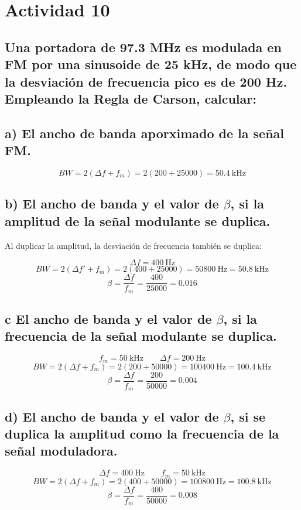 \section{ Actividad 10}

\subsection*{Una portadora de 97.3 MHz es modulada en FM por una sinusoide de 25 kHz,  de modo que la desviación de frecuencia pico es de 200 Hz. Empleando la Regla de Carson, calcular: }  

\subsection*{a) El ancho de banda aporximado de la señal FM.}

    \[
        BW = 2(\Delta f + f_m) = 2(200 + 25000) = 50.4~\text{kHz}
    \]
        
\subsection*{b) El ancho de banda y el valor de $\beta$, si la amplitud de la señal modulante se duplica.}
    
Al duplicar la amplitud, la desviación de frecuencia también se duplica:

    \[
        \Delta f = 400~\text{Hz}
    \]
    \[
        BW = 2(\Delta f' + f_m) = 2(400 + 25000) = 50800~\text{Hz} = 50.8~\text{kHz}
    \]
    \[
        \beta = \frac{\Delta f}{f_m} = \frac{400}{25000} = 0.016
    \]

\subsection*{c El ancho de banda y el valor de $\beta$, si la frecuencia de la señal modulante se duplica.}
    
    \[
        f_m = 50~\text{kHz} \qquad \Delta f = 200~\text{Hz}
    \]
    \[
        BW = 2(\Delta f + f_m) = 2(200 + 50000) = 100400~\text{Hz} = 100.4~\text{kHz}
    \]
    \[
        \beta = \frac{\Delta f}{f_m} = \frac{200}{50000} = 0.004
    \]

\subsection*{d) El ancho de banda y el valor de $\beta$, si se duplica la amplitud como la frecuencia de la señal moduladora.}
    
    \[
        \Delta f = 400~\text{Hz} \qquad f_m = 50~\text{kHz}
    \]
    \[
        BW = 2(\Delta f + f_m) = 2(400 + 50000) = 100800~\text{Hz} = 100.8~\text{kHz}
    \]
    \[
        \beta = \frac{\Delta f}{f_m} = \frac{400}{50000} = 0.008
    \]